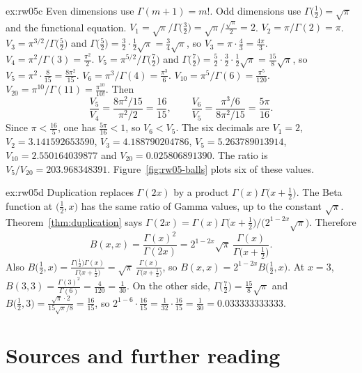 \begin{solution}{ex:rw05c}
\idea Even dimensions use $\Gamma(m+1)=m!$. Odd dimensions use $\Gamma\bigl(\frac12\bigr)=\sqrt\pi$ and the functional equation.
\writeup $V_1=\sqrt\pi\big/\Gamma\bigl(\frac32\bigr)=\sqrt\pi\big/\frac{\sqrt\pi}2=2$. $V_2=\pi/\Gamma(2)=\pi$. $V_3=\pi^{3/2}\big/\Gamma\bigl(\frac52\bigr)$ and $\Gamma\bigl(\frac52\bigr)=\frac32\cdot\frac12\sqrt\pi=\frac34\sqrt\pi$, so $V_3=\pi\cdot\frac43=\frac{4\pi}3$. $V_4=\pi^2/\Gamma(3)=\frac{\pi^2}2$. $V_5=\pi^{5/2}\big/\Gamma\bigl(\frac72\bigr)$ and $\Gamma\bigl(\frac72\bigr)=\frac52\cdot\frac32\cdot\frac12\sqrt\pi=\frac{15}8\sqrt\pi$, so $V_5=\pi^2\cdot\frac8{15}=\frac{8\pi^2}{15}$. $V_6=\pi^3/\Gamma(4)=\frac{\pi^3}6$. $V_{10}=\pi^5/\Gamma(6)=\frac{\pi^5}{120}$. $V_{20}=\pi^{10}/\Gamma(11)=\frac{\pi^{10}}{10!}$. Then
\[
\frac{V_5}{V_4}=\frac{8\pi^2/15}{\pi^2/2}=\frac{16}{15},\qquad\frac{V_6}{V_5}=\frac{\pi^3/6}{8\pi^2/15}=\frac{5\pi}{16}.
\]
Since $\pi<\frac{16}5$, one has $\frac{5\pi}{16}<1$, so $V_6<V_5$. The six decimals are $V_1=2$, $V_2=3.141592653590$, $V_3=4.188790204786$, $V_5=5.263789013914$, $V_{10}=2.550164039877$ and $V_{20}=0.025806891390$. The ratio is $V_5/V_{20}=203.968348391$. Figure~\ref{fig:rw05-balls} plots six of these values.
\end{solution}

\begin{solution}{ex:rw05d}
\idea Duplication replaces $\Gamma(2x)$ by a product $\Gamma(x)\Gamma\bigl(x+\frac12\bigr)$. The Beta function at $\bigl(\frac12,x\bigr)$ has the same ratio of Gamma values, up to the constant $\sqrt\pi$.
\writeup Theorem~\ref{thm:duplication} says $\Gamma(2x)=\Gamma(x)\Gamma\bigl(x+\frac12\bigr)\big/\bigl(2^{1-2x}\sqrt\pi\bigr)$. Therefore
\[
B(x,x)=\frac{\Gamma(x)^2}{\Gamma(2x)}=2^{1-2x}\sqrt\pi\,\frac{\Gamma(x)}{\Gamma\bigl(x+\frac12\bigr)}.
\]
Also $B\bigl(\frac12,x\bigr)=\frac{\Gamma\bigl(\frac12\bigr)\Gamma(x)}{\Gamma\bigl(x+\frac12\bigr)}=\sqrt\pi\,\frac{\Gamma(x)}{\Gamma\bigl(x+\frac12\bigr)}$, so $B(x,x)=2^{1-2x}B\bigl(\frac12,x\bigr)$. At $x=3$, $B(3,3)=\frac{\Gamma(3)^2}{\Gamma(6)}=\frac{4}{120}=\frac1{30}$. On the other side, $\Gamma\bigl(\frac72\bigr)=\frac{15}8\sqrt\pi$ and $B\bigl(\frac12,3\bigr)=\frac{\sqrt\pi\cdot2}{15\sqrt\pi/8}=\frac{16}{15}$, so $2^{1-6}\cdot\frac{16}{15}=\frac1{32}\cdot\frac{16}{15}=\frac1{30}=0.033333333333$.
\end{solution}

\section*{Sources and further reading}

